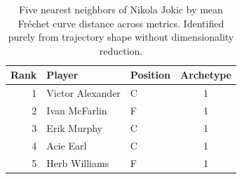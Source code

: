 \begin{table}[htbp]
  \centering\small
  \begin{tabular}{rllc}
    \toprule
    Rank & Player & Position & Archetype \\
    \midrule
    1 & Victor Alexander & C & 1 \\
    2 & Ivan McFarlin & F & 1 \\
    3 & Erik Murphy & C & 1 \\
    4 & Acie Earl & C & 1 \\
    5 & Herb Williams & F & 1 \\
    \bottomrule
  \end{tabular}
  \caption{Five nearest neighbors of Nikola Jokic by mean Fr\'{e}chet curve distance across metrics. Identified purely from trajectory shape without dimensionality reduction.}
  \label{tab:Nikola_Jokic_frechet_curve_neighbors}
\end{table}

